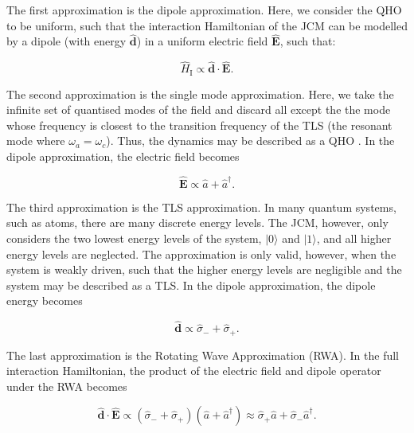 \documentclass[12pt]{article}
\begin{document}
The first approximation is the dipole approximation. Here, we consider the QHO to be uniform, such that the interaction Hamiltonian of the JCM can be modelled by a dipole (with energy $\boldsymbol{\hat{d}}$) in a uniform electric field $\boldsymbol{\hat{E}}$, such that:

\begin{equation*}
    \hat{H}_{\scriptscriptstyle \text{I}} \propto \boldsymbol{\hat{d}} \cdot \boldsymbol{\hat{E}}.
\end{equation*}

The second approximation is the single mode approximation. Here, we take the infinite set of quantised modes of the field and discard all except the the mode whose frequency is closest to the transition frequency of the TLS (the resonant mode where $\omega_a = \omega_c$). Thus, the dynamics may be described as a QHO \cite{General2024-JCM_relevance}. In the dipole approximation, the electric field becomes

\begin{equation*}
    \boldsymbol{\hat{E}}  \propto \hat{a} + \hat{a}^\dagger.
\end{equation*}


The third approximation is the TLS approximation. In many quantum systems, such as atoms, there are many discrete energy levels. The JCM, however, only considers the two lowest energy levels of the system, $|0\rangle$ and $|1\rangle$, and all higher energy levels are neglected. The approximation is only valid, however, when the system is weakly driven, such that the higher energy levels are negligible and the system may be described as a TLS. In the dipole approximation, the dipole energy becomes

\begin{equation*}
    \boldsymbol{\hat{d}}  \propto \hat{\sigma}_{-} + \hat{\sigma}_{+}.
\end{equation*}

The last approximation is the Rotating Wave Approximation (RWA). In the full interaction Hamiltonian, the product of the electric field and dipole operator under the RWA becomes

\begin{equation}
    \boldsymbol{\hat{d}} \cdot \boldsymbol{\hat{E}} \propto (\hat{\sigma}_{-} + \hat{\sigma}_{+})(\hat{a} + \hat{a}^\dagger) \approx \hat{\sigma}_{+}\hat{a} +\hat{\sigma}_{-}\hat{a}^\dagger. 
\end{equation}
\end{document}
